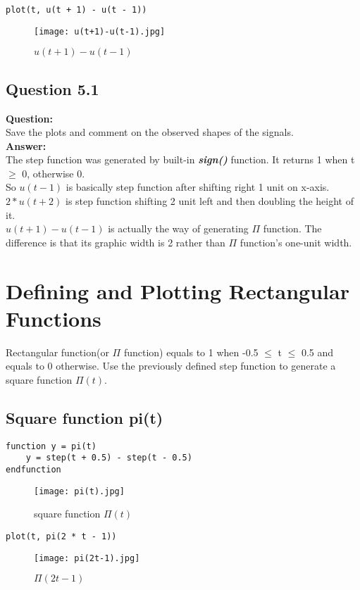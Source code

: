 \documentclass[12pt,fleqn]{article}
\begin{document}
\begin{lstlisting}[frame=single]
plot(t, u(t + 1) - u(t - 1))
\end{lstlisting}
\begin{figure}[H]
\centering
\texttt{[image: u(t+1)-u(t-1).jpg]}
\caption{$u(t+1)-u(t-1)$}
\end{figure}
\subsection{Question 5.1}
\textbf{Question:}\\
Save the plots and comment on the observed shapes of the signals.\\
\textbf{Answer:}\\
The step function was generated by built-in \emph{\textbf{sign()}} function. It returns 1 when t $\geq$ 0, otherwise 0. \\
So $u(t-1)$ is basically step function after shifting right 1 unit on x-axis. \\
$2*u(t+2)$ is step function shifting 2 unit left and then doubling the height of it. \\
$u(t+1)-u(t-1)$ is actually the way of generating $\Pi$ function. The difference is that its graphic width is 2 rather than $\Pi$ function's one-unit width.

\section{Defining and Plotting Rectangular Functions}
Rectangular function(or $\Pi$ function) equals to 1 when -0.5 $\leq$ t $\leq$ 0.5 and equals to 0 otherwise. Use the previously defined step function to generate a square function $\Pi(t)$.
\subsection{Square function pi(t)}
\begin{lstlisting}[frame=single]
function y = pi(t)
    y = step(t + 0.5) - step(t - 0.5)
endfunction
\end{lstlisting}
\begin{figure}[H]
\centering
\texttt{[image: pi(t).jpg]}
\caption{square function $\Pi(t)$}
\end{figure}

\begin{lstlisting}[frame=single]
plot(t, pi(2 * t - 1))
\end{lstlisting}
\begin{figure}[H]
\centering
\texttt{[image: pi(2t-1).jpg]}
\caption{$\Pi(2t-1)$}
\end{figure}
\end{document}
